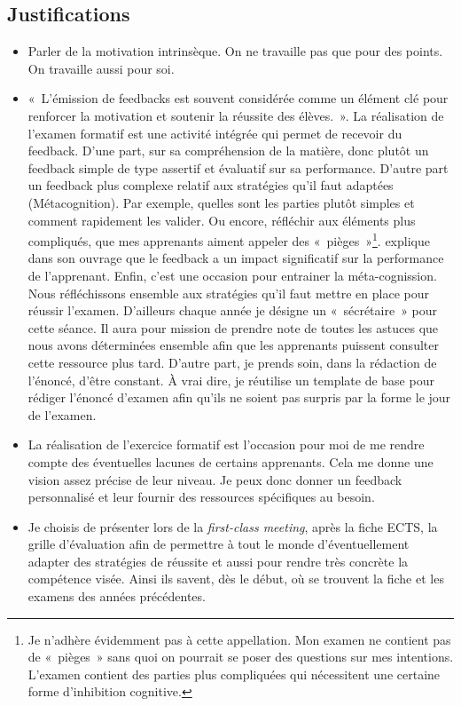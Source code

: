 \subsection{Justifications}
\label{evaluation_des_apprentissages_justifications}
\begin{itemize}
    \item Parler de la motivation intrinsèque. On ne travaille pas que pour des points. On travaille aussi pour soi.
    \item «~L’émission de feedbacks est souvent considérée comme un élément clé pour renforcer la motivation et soutenir la réussite des élèves.~»\cite{georges2011feedbacks}. La réalisation de l'examen formatif est une activité intégrée qui permet de recevoir du feedback. D'une part, sur sa compréhension de la matière, donc plutôt un feedback simple de type assertif et évaluatif\cite{georges2011feedbacks} sur sa performance. D'autre part un feedback plus complexe relatif aux stratégies qu'il faut adaptées (Métacognition). Par exemple, quelles sont les parties plutôt simples et comment rapidement les valider. Ou encore, réfléchir aux éléments plus compliqués, que mes apprenants aiment appeler des «~pièges~»\footnote{Je n'adhère évidemment pas à cette appellation. Mon examen ne contient pas de «~pièges~» sans quoi on pourrait se poser des questions sur mes intentions. L'examen contient des parties plus compliquées qui nécessitent une certaine forme d'inhibition cognitive.}. \citet{hattie2008visible} explique dans son ouvrage que le feedback a un impact significatif sur la performance de l'apprenant. Enfin, c'est une occasion pour entrainer la méta-cognission\cite{leclercq2008modele}. Nous réfléchissons ensemble aux stratégies qu'il faut mettre en place pour réussir l'examen. D'ailleurs chaque année je désigne un «~sécrétaire~» pour cette séance. Il aura pour mission de prendre note de toutes les astuces que nous avons déterminées ensemble afin que les apprenants puissent consulter cette ressource plus tard. D'autre part, je prends soin, dans la rédaction de l'énoncé, d'être constant. À vrai dire, je réutilise un template de base pour rédiger l'énoncé d’examen afin qu’ils ne soient pas surpris par la forme le jour de l'examen.
    \item La réalisation de l'exercice formatif est l'occasion pour moi de me rendre compte des éventuelles lacunes de certains apprenants. Cela me donne une vision assez précise de leur niveau. Je peux donc donner un feedback personnalisé et leur fournir des ressources spécifiques au besoin.
    \item Je choisis de présenter lors de la \textit{first-class meeting}, après la fiche ECTS, la grille d'évaluation afin de permettre à tout le monde d'éventuellement adapter des stratégies de réussite et aussi pour rendre très concrète la compétence visée. Ainsi ils savent, dès le début, où se trouvent la fiche et les examens des années précédentes.
\end{itemize}

